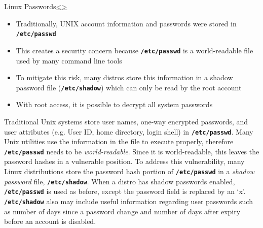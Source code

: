\documentclass[12pt]{extarticle}
\newcommand{\code}[1]{\texttt{\bfseries#1}}
\newenvironment{instructionblock}{\Large\bgroup}{\egroup}
\begin{document}
\pagebreak
\begin{slide}{Linux Passwords}{\hyperref[slide 6]{\textless}\hyperref[slide 8]{\textgreater}}
\begin{instructionblock}
\begin{itemize}
\item Traditionally, UNIX account information and passwords were stored in \code{/etc/passwd}
\item This creates a security concern because \code{/etc/passwd} is a world-readable file used by many command line tools
\item To mitigate this risk, many distros store this information in a shadow password file (\code{/etc/shadow}) which can only be read by the root account
\item With root access, it is possible to decrypt all system passwords
\end{itemize}
\end{instructionblock}
\end{slide}
\vfill

Traditional Unix systems store user names, one-way encrypted passwords, and user attributes (e.g. User ID, home directory, login shell) in \code{/etc/passwd}. Many Unix utilities use the information in the file to execute properly, therefore \code{/etc/passwd} needs to be \textit{world-readable}. Since it is world-readable, this leaves the password hashes in a vulnerable position. To address this vulnerability, many Linux distributions store the password hash portion of \code{/etc/passwd} in a \textit{shadow password} file, \code{/etc/shadow}.
When a distro has shadow passwords enabled, \code{/etc/passwd} is used as before, except the password field is replaced by an `x'. \code{/etc/shadow} also may include useful information regarding user passwords such as number of days since a password change and number of days after expiry before an account is disabled. \cite{frampton}
\end{document}

